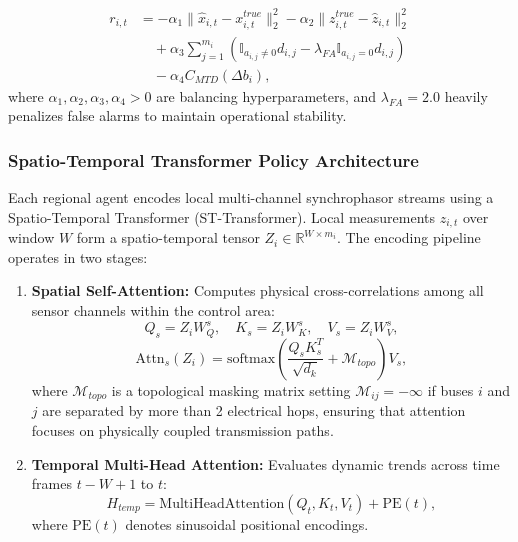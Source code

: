 \documentclass[journal,compsoc]{IEEEtran}
\begin{document}
\begin{itemize}
    \begin{align}
        r_{i,t} &= -\alpha_1 \|\hat{x}_{i,t} - x_{i,t}^{true}\|_2^2 - \alpha_2 \|z_{i,t}^{true} - \hat{z}_{i,t}\|_2^2 \nonumber \\
        &\quad + \alpha_3 \sum_{j=1}^{m_i} \left( \mathbb{I}_{a_{i,j} \ne 0} d_{i,j} - \lambda_{FA} \mathbb{I}_{a_{i,j} = 0} d_{i,j} \right) \nonumber \\
        &\quad - \alpha_4 C_{MTD}(\Delta b_i),
    \end{align}
    where $\alpha_1, \alpha_2, \alpha_3, \alpha_4 > 0$ are balancing hyperparameters, and $\lambda_{FA} = 2.0$ heavily penalizes false alarms to maintain operational stability.
\end{itemize}

\subsubsection{Spatio-Temporal Transformer Policy Architecture}
Each regional agent encodes local multi-channel synchrophasor streams using a Spatio-Temporal Transformer (ST-Transformer). Local measurements $z_{i,t}$ over window $W$ form a spatio-temporal tensor $Z_i \in \mathbb{R}^{W \times m_i}$. The encoding pipeline operates in two stages:
\begin{enumerate}
    \item \textbf{Spatial Self-Attention:} Computes physical cross-correlations among all sensor channels within the control area:
    \begin{equation}
        Q_s = Z_i W_Q^s, \quad K_s = Z_i W_K^s, \quad V_s = Z_i W_V^s,
    \end{equation}
    \begin{equation}
        \text{Attn}_s(Z_i) = \text{softmax}\left( \frac{Q_s K_s^T}{\sqrt{d_k}} + \mathcal{M}_{topo} \right) V_s,
    \end{equation}
    where $\mathcal{M}_{topo}$ is a topological masking matrix setting $\mathcal{M}_{ij} = -\infty$ if buses $i$ and $j$ are separated by more than 2 electrical hops, ensuring that attention focuses on physically coupled transmission paths.
    \item \textbf{Temporal Multi-Head Attention:} Evaluates dynamic trends across time frames $t-W+1$ to $t$:
    \begin{equation}
        H_{temp} = \text{MultiHeadAttention}(Q_t, K_t, V_t) + \text{PE}(t),
    \end{equation}
    where $\text{PE}(t)$ denotes sinusoidal positional encodings.
\end{enumerate}
\end{document}
